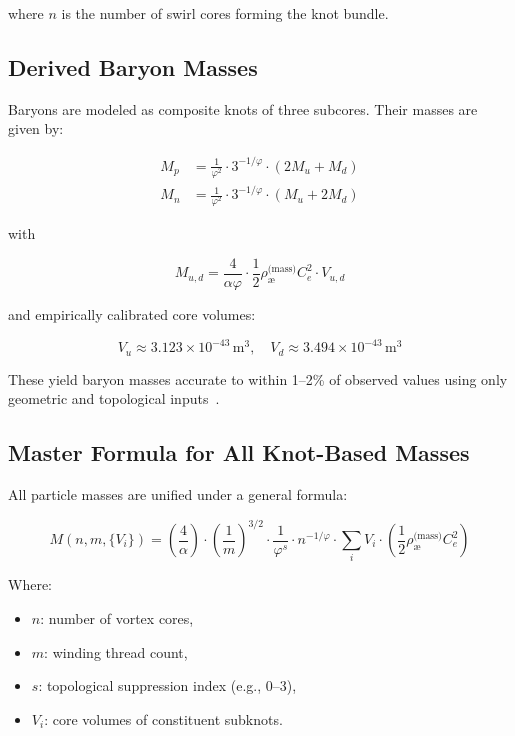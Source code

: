 \documentclass[preprint]{revtex4-2}
\begin{document}
    where \( n \) is the number of swirl cores forming the knot bundle.

    \subsection{Derived Baryon Masses}
    Baryons are modeled as composite knots of three subcores. Their masses are given by:

    \begin{align}
    M_p &= \frac{1}{\varphi^2} \cdot 3^{-1/\varphi} \cdot (2 M_u + M_d) \\
    M_n &= \frac{1}{\varphi^2} \cdot 3^{-1/\varphi} \cdot (M_u + 2 M_d)
    \end{align}

    with

    \begin{equation}
    M_{u,d} = \frac{4}{\alpha \varphi} \cdot \frac{1}{2} \rho_{\text{\ae}}^{\text{(mass)}} C_e^2 \cdot V_{u,d}
    \end{equation}

    and empirically calibrated core volumes:

    \begin{equation}
    V_u \approx 3.123 \times 10^{-43} \, \text{m}^3, \quad V_d \approx 3.494 \times 10^{-43} \, \text{m}^3
    \end{equation}

    These yield baryon masses accurate to within 1–2\% of observed values using only geometric and topological inputs~\cite{kleckner2013creation}.

    \subsection{Master Formula for All Knot-Based Masses}
    All particle masses are unified under a general formula:

    \begin{equation}
    M(n, m, \{V_i\}) = \left( \frac{4}{\alpha} \right) \cdot \left( \frac{1}{m} \right)^{3/2} \cdot \frac{1}{\varphi^s} \cdot n^{-1/\varphi} \cdot \sum_i V_i \cdot \left( \frac{1}{2} \rho_{\text{\ae}}^{\text{(mass)}} C_e^2 \right)
    \label{eq:mass_master}
    \end{equation}

    Where:
    \begin{itemize}
        \item \( n \): number of vortex cores,
        \item \( m \): winding thread count,
        \item \( s \): topological suppression index (e.g., 0–3),
        \item \( V_i \): core volumes of constituent subknots.
    \end{itemize}
\end{document}
